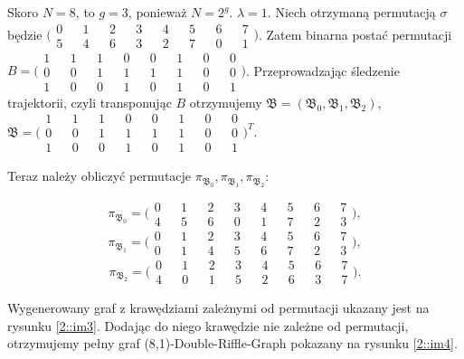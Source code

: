 \begin{example}
	Skoro $N = 8$, to $g = 3$, ponieważ $N = 2^g$. $\lambda = 1$.
	Niech otrzymaną permutacją $\sigma$ będzie $\bigl( \begin{smallmatrix}
	0 && 1 && 2 && 3 && 4 && 5 && 6 && 7 \\
	5 && 4 && 6 && 3 && 2 && 7 && 0 && 1
	\end{smallmatrix} \bigr) $.
	Zatem binarna postać permutacji $B = \bigl( \begin{smallmatrix}
		1 && 1 && 1 && 0 && 0 && 1 && 0 && 0 \\
		0 && 0 && 1 && 1 && 1 && 1 && 0 && 0 \\
		1 && 0 && 0 && 1 && 0 && 1 && 0 && 1
	\end{smallmatrix} \bigr) $.
	Przeprowadzając śledzenie trajektorii, czyli transponując $B$ otrzymujemy
	$\mathfrak{B} = (\mathfrak{B_0}, \mathfrak{B_1}, \mathfrak{B_2})$, $\mathfrak{B} =\bigl( \begin{smallmatrix}
	1 && 1 && 1 && 0 && 0 && 1 && 0 && 0 \\
	0 && 0 && 1 && 1 && 1 && 1 && 0 && 0 \\
	1 && 0 && 0 && 1 && 0 && 1 && 0 && 1
	\end{smallmatrix} \bigr)^{T} $.
	
	Teraz należy obliczyć permutacje $\pi_{\mathfrak{B_0}},\pi_{\mathfrak{B_1}},\pi_{\mathfrak{B_2}}$:
	
	$$ \pi_{\mathfrak{B_0}}=\bigl( \begin{smallmatrix}
	0 && 1 && 2 && 3 && 4 && 5 && 6 && 7 \\
	4 && 5 && 6 && 0 && 1 && 7 && 2 && 3
	\end{smallmatrix} \bigr), $$
		$$ \pi_{\mathfrak{B_1}}=\bigl( \begin{smallmatrix}
	0 && 1 && 2 && 3 && 4 && 5 && 6 && 7 \\
	0 && 1 && 4 && 5 && 6 && 7 && 2 && 3
	\end{smallmatrix} \bigr), $$
		$$ \pi_{\mathfrak{B_2}}=\bigl( \begin{smallmatrix}
	0 && 1 && 2 && 3 && 4 && 5 && 6 && 7 \\
	4 && 0 && 1 && 5 && 2 && 6 && 3 && 7
	\end{smallmatrix} \bigr). $$
	
	Wygenerowany graf z krawędziami zależnymi od permutacji ukazany jest na rysunku \ref{2::im3}.
	Dodając do niego krawędzie nie zależne od permutacji, otrzymujemy pełny graf (8,1)-Double-Riffle-Graph pokazany na rysunku \ref{2::im4}.
	
\end{example}


